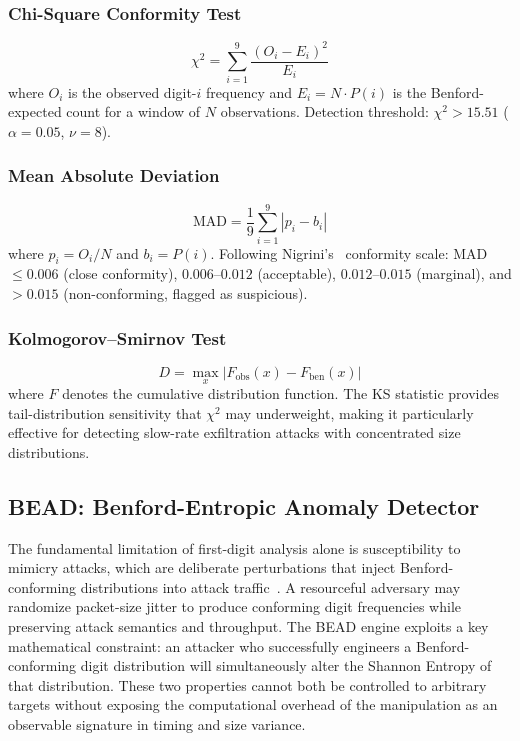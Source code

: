 \documentclass[conference]{IEEEtran}
\begin{document}
\subsubsection{Chi-Square Conformity Test}

\begin{equation}
  \chi^2 = \sum_{i=1}^{9} \frac{(O_i - E_i)^2}{E_i}
  \label{eq:chi2}
\end{equation}
where $O_i$ is the observed digit-$i$ frequency and $E_i = N \cdot P(i)$ is
the Benford-expected count for a window of $N$ observations.
Detection threshold: $\chi^2 > 15.51$ ($\alpha = 0.05$, $\nu = 8$).

\subsubsection{Mean Absolute Deviation}

\begin{equation}
  \text{MAD} = \frac{1}{9}\sum_{i=1}^{9}\left|p_i - b_i\right|
  \label{eq:mad}
\end{equation}
where $p_i = O_i / N$ and $b_i = P(i)$. Following Nigrini's~\cite{b6}
conformity scale: MAD $\leq 0.006$ (close conformity), $0.006$--$0.012$
(acceptable), $0.012$--$0.015$ (marginal), and $>0.015$ (non-conforming,
flagged as suspicious).

\subsubsection{Kolmogorov--Smirnov Test}

\begin{equation}
  D = \max_{x}\bigl|F_{\mathrm{obs}}(x) - F_{\mathrm{ben}}(x)\bigr|
  \label{eq:ks}
\end{equation}
where $F$ denotes the cumulative distribution function. The KS statistic
provides tail-distribution sensitivity that $\chi^2$ may underweight, making
it particularly effective for detecting slow-rate exfiltration attacks with
concentrated size distributions.

\subsection{BEAD: Benford-Entropic Anomaly Detector}
\label{sec:hybrid}

The fundamental limitation of first-digit analysis alone is susceptibility
to mimicry attacks, which are deliberate perturbations that inject
Benford-conforming distributions into attack traffic~\cite{b3,b11}. A
resourceful adversary may randomize packet-size jitter to produce conforming
digit frequencies while preserving attack semantics and throughput. The
BEAD engine exploits a key mathematical constraint: an attacker who
successfully engineers a Benford-conforming digit distribution will
simultaneously alter the Shannon Entropy of that distribution. These two
properties cannot both be controlled to arbitrary targets without exposing
the computational overhead of the manipulation as an observable signature in
timing and size variance.
\end{document}
